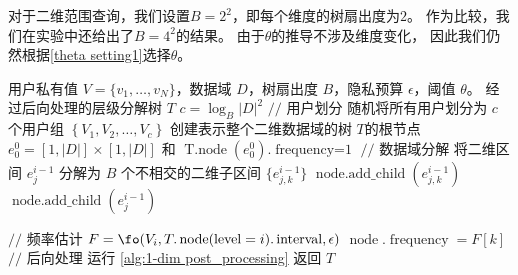 对于二维范围查询，我们设置$B=2^2$，即每个维度的树扇出度为$2$。
作为比较，我们在实验中还给出了$B=4^2$的结果。
由于$\theta$的推导不涉及维度变化，
因此我们仍然根据\autoref{theta setting1}选择$\theta$。

\begin{algorithm}[!htbp]
    \caption{构建二维\myahead 层级分解树}
    \label{Construct 2-dim prototype tree}
	\begin{algorithmic}[1]
        \REQUIRE 用户私有值 $V=\{v_1, \ldots, v_N\}$，数据域 $D$，树扇出度 $B$，隐私预算 $\epsilon$，阈值 $\theta$。
        \ENSURE 经过后向处理的\myahead 层级分解树 $T$
		\STATE $c = {\log_B}|D|^2$
        \STATE $//$ 用户划分
        \STATE 随机将所有用户划分为 $c$ 个用户组 $\left\{ V_1, V_2, \ldots, V_c \right\}$
        \STATE 创建表示整个二维数据域的树 $T$的根节点 $e^0_0 = [1, |D|] \times [1, |D|]$ 和 $\operatorname{T.node}(e^0_0).\operatorname{frequency = 1}$
            \STATE $//$ 数据域分解
            \STATE 将二维区间 $e^{i-1}_j$ 分解为 $B$ 个不相交的二维子区间 $\{e^{i-1}_{j,k}\}$
    		\STATE $\operatorname{node.add\_child}(e^{i-1}_{j,k})$
            \ENDFOR
            \ELSE
            \STATE $\operatorname{node.add\_child}(e^{i-1}_{j})$
            \ENDIF 		
            \ENDFOR

            \STATE $//$ 频率估计
            \STATE $F = \fo(V_i, T.\operatorname{node}(\operatorname{level}=i).\operatorname{interval}, \epsilon)$
    		\STATE $\operatorname{node}.\operatorname{frequency} = F[k]$
            \ENDFOR
        \ENDFOR
        \STATE $//$ 后向处理
        \STATE 运行 \autoref{alg:1-dim post_processing}
        \STATE 返回 $T$
	\end{algorithmic}
\end{algorithm}

